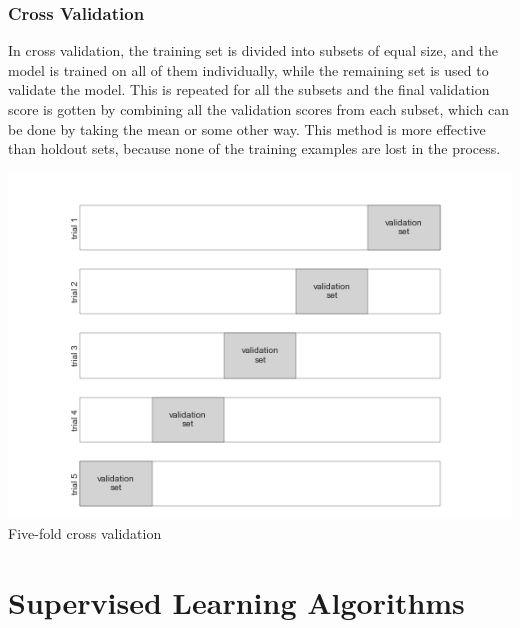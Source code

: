 \documentclass[12pt]{article}
\begin{document}
\subsubsection*{Cross Validation}
In cross validation, the training set is divided into subsets of equal size, and the model is trained on all of them individually, while the remaining set is used to validate the model. This is repeated for all the subsets and the final validation score is gotten by combining all the validation scores from each subset, which can be done by taking the mean or some other way. This method is more effective than holdout sets, because none of the training examples are lost in the process.
\begin{center}
    \includegraphics*[width=15cm]{cv.png}\\
    Five-fold cross validation
\end{center}
\newpage 


\section{Supervised Learning Algorithms}
\end{document}
